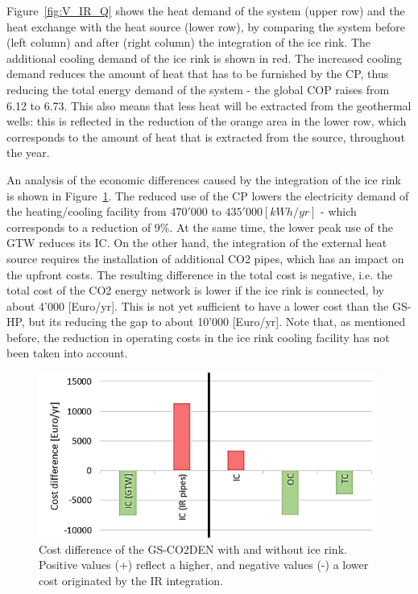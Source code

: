 \documentclass{article}
\begin{document}
Figure~\ref{fig:V_IR_Q} shows the heat demand of the system (upper row) and the heat exchange with the heat source (lower row), by comparing the system before (left column) and after (right column) the integration of the ice rink. The additional cooling demand of the ice rink is shown in red. The increased cooling demand reduces the amount of heat that has to be furnished by the CP, thus reducing the total energy demand of the system - the global COP raises from 6.12 to 6.73. This also means that less heat will be extracted from the geothermal wells: this is reflected in the reduction of the orange area in the lower row, which corresponds to the amount of heat that is extracted from the source, throughout the year.


An analysis of the economic differences caused by the integration of the ice rink is shown in Figure~\ref{fig:V_IR_cost}. The reduced use of the CP lowers the electricity demand of the heating/cooling facility from $470'000$ to $435'000 [kWh/yr]$ - which corresponds to a reduction of 9\%. At the same time, the lower peak use of the GTW reduces its IC. On the other hand, the integration of the external heat source requires the installation of additional CO2 pipes, which has an impact on the upfront costs. The resulting difference in the total cost is negative, i.e. the total cost of the CO2 energy network is lower if the ice rink is connected, by about 4'000 [Euro/yr]. This is not yet sufficient to have a lower cost than the GS-HP, but its reducing the gap to about 10'000 [Euro/yr]. Note that, as mentioned before, the reduction in operating costs in the ice rink cooling facility has not been taken into account.\\

%

\begin{figure}[tph]
	\centering
	\includegraphics[width=0.7\linewidth]{Images/V_IR_cost}
	\caption{Cost difference of the GS-CO2DEN with and without ice rink. Positive values (+) reflect a higher, and negative values (-) a lower cost originated by the IR integration.}
	\label{fig:V_IR_cost}
\end{figure}
\end{document}
